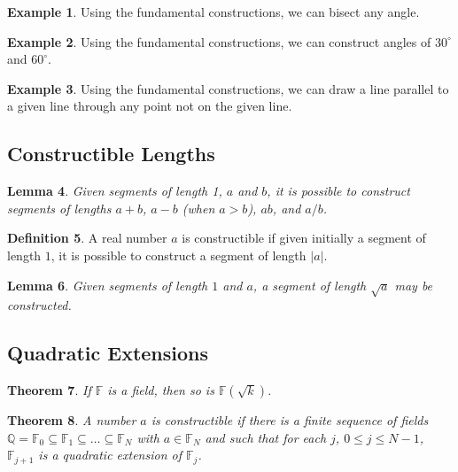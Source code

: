 \documentclass[11pt]{article}
\renewcommand\subset\subseteq
\newtheorem{theorem}{Theorem}[section]
\newtheorem{lemma}[theorem]{Lemma}
\theoremstyle{definition}
\newtheorem{definition}[theorem]{Definition}
\newtheorem{example}[theorem]{Example}
\begin{document}
\begin{example}
  Using the fundamental constructions, we can bisect any angle.
\end{example}

\begin{example}
  Using the fundamental constructions, we can construct angles of $30^\circ$ and $60^\circ$.
\end{example}

\begin{example}
  Using the fundamental constructions, we can draw a line parallel to a given line through any point not on the given line.
\end{example}

\subsection{Constructible Lengths}

\begin{lemma}
  Given segments of length 1, $a$ and $b$, it is possible to construct segments of lengths $a+b$, $a-b$ (when $a>b$), $ab$, and $a/b$.
  \label{lemma: rational constructions}
\end{lemma}

\begin{definition}
  A real number $a$ is constructible if given initially a segment of length $1$, it is possible to construct a segment of length $|a|$.
\end{definition}

\begin{lemma}
  Given segments of length $1$ and $a$, a segment of length $\sqrt{a}$ may be constructed.
  \label{lemma: sqrt can be constructed}
\end{lemma}

\subsection{Quadratic Extensions}

\begin{theorem}
  If $\mathbb{F}$ is a field, then so is $\mathbb{F}(\sqrt{k})$.
  \label{theorem: quadratic extensions of fields are fields}
\end{theorem}

\begin{theorem}
  A number $a$ is constructible if there is a finite sequence of fields $\mathbb{Q} = \mathbb{F}_0 \subset \mathbb{F}_1\subset \dots \subset \mathbb{F}_N$ with
  $a\in\mathbb{F}_N$ and such that for each $j$, $0\leq j \leq N-1$, $\mathbb{F}_{j+1}$ is a quadratic extension of $\mathbb{F}_j$.
  \label{theorem: constructible if in sequence of quadratic extensions}
\end{theorem}
\end{document}
